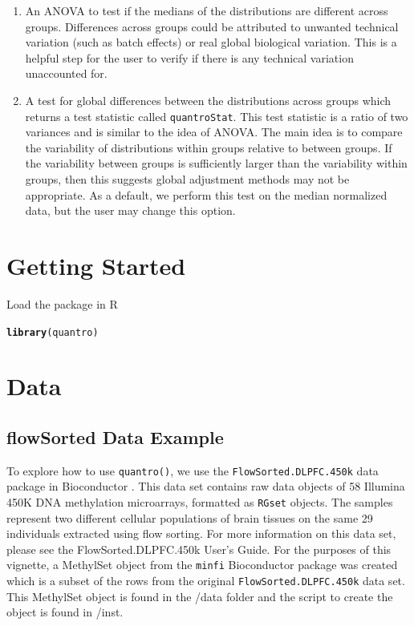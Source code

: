 \documentclass{article}\usepackage[]{graphicx}\usepackage[usenames,dvipsnames]{color}
\makeatletter
\newcommand{\hlstd}[1]{\textcolor[rgb]{0.345,0.345,0.345}{#1}}%
\newcommand{\hlkwd}[1]{\textcolor[rgb]{0.737,0.353,0.396}{\textbf{#1}}}%
\newenvironment{kframe}{%
 \def\at@end@of@kframe{}%
 \ifinner\ifhmode%
  \def\at@end@of@kframe{\end{minipage}}%
  \begin{minipage}{\columnwidth}%
 \fi\fi%
 \def\FrameCommand##1{\hskip\@totalleftmargin \hskip-\fboxsep
 \colorbox{shadecolor}{##1}\hskip-\fboxsep
     \hskip-\linewidth \hskip-\@totalleftmargin \hskip\columnwidth}%
 \MakeFramed {\advance\hsize-\width
   \@totalleftmargin\z@ \linewidth\hsize
   \@setminipage}}%
 {\par\unskip\endMakeFramed%
 \at@end@of@kframe}
\newenvironment{knitrout}{}{} %
\makeatother
\begin{document}
\begin{enumerate} 

\item An ANOVA to test if the medians of the distributions are different 
across groups. Differences across groups could be attributed to unwanted 
technical variation (such as batch effects) or real global biological 
variation. This is a helpful step for the user to verify if there is any 
technical variation unaccounted for. 

\item A test for global differences between the distributions across groups 
which returns a test statistic called \texttt{quantroStat}. This test 
statistic is a ratio of two variances and is similar to the idea of ANOVA. 
The main idea is to compare the variability of distributions within groups 
relative to between groups. If the variability between groups is sufficiently 
larger than the variability within groups, then this suggests global 
adjustment methods may not be appropriate. As a default, we perform this test 
on the median normalized data, but the user may change this option. 

\end{enumerate}



\section{Getting Started}

Load the package in R

\begin{knitrout}
\color{fgcolor}\begin{kframe}
\begin{alltt}
\hlkwd{library}\hlstd{(quantro)}
\end{alltt}
\end{kframe}
\end{knitrout}

\section{Data}

\subsection{flowSorted Data Example}
To explore how to use \texttt{quantro()}, we use the 
\texttt{FlowSorted.DLPFC.450k} data package in Bioconductor 
\cite{JaffeFlowSorted}.  This data set contains raw data objects of 58 
Illumina 450K DNA methylation microarrays, formatted as \texttt{RGset} 
objects. The samples represent two different cellular populations of brain 
tissues on the same 29 individuals extracted using flow sorting.  For more 
information on this data set, please see the FlowSorted.DLPFC.450k User's 
Guide.  For the purposes of this vignette, a MethylSet object from the 
\texttt{minfi} Bioconductor package \cite{Aryee2014} was created which is 
a subset of the rows from the original \texttt{FlowSorted.DLPFC.450k} data 
set. This MethylSet object is found in the /data folder and the script to 
create the object is found in /inst.  
\end{document}
